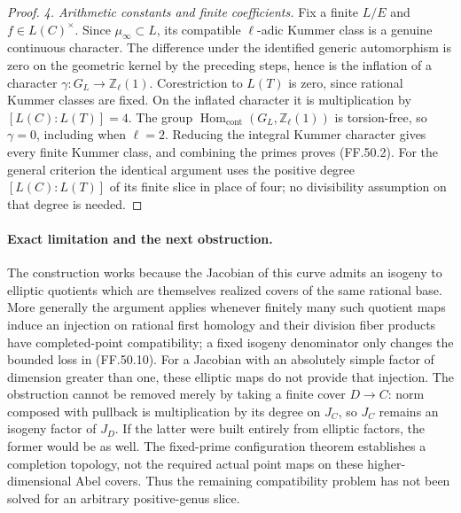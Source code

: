 \begin{proof}
\emph{4. Arithmetic constants and finite coefficients.}
Fix a finite \(L/E\) and \(f\in L(C)^\times\).
Since \(\mu_\infty\subset L\), its compatible
\(\ell\)-adic Kummer class is a genuine continuous
character. The difference under the identified
generic automorphism is zero on the geometric
kernel by the preceding steps, hence is the
inflation of a character
\(\gamma:G_L\to\mathbb Z_\ell(1)\).
Corestriction to \(L(T)\) is zero, since rational
Kummer classes are fixed. On the inflated character
it is multiplication by \([L(C):L(T)]=4\).
The group \(\operatorname{Hom}_{\mathrm{cont}}
(G_L,\mathbb Z_\ell(1))\) is torsion-free, so
\(\gamma=0\), including when \(\ell=2\).
Reducing the integral Kummer character gives every
finite Kummer class, and combining the primes
proves (FF.50.2).
For the general criterion the identical argument uses
the positive degree \([L(C):L(T)]\) of its finite
slice in place of four; no divisibility assumption
on that degree is needed.
\end{proof}

\paragraph{Exact limitation and the next obstruction.}
The construction works because the Jacobian of this
curve admits an isogeny to elliptic quotients which
are themselves realized covers of the same rational
base. More generally the argument applies whenever
finitely many such quotient maps induce an injection
on rational first homology and their division
fiber products have completed-point compatibility;
a fixed isogeny denominator only changes the bounded
loss in (FF.50.10). For a Jacobian with an absolutely
simple factor of dimension greater than one, these
elliptic maps do not provide that injection. The
obstruction cannot be removed merely by taking a
finite cover \(D\to C\): norm composed with
pullback is multiplication by its degree on
\(J_C\), so \(J_C\) remains an isogeny factor
of \(J_D\). If the latter were built entirely
from elliptic factors, the former would be as well.
The
fixed-prime configuration theorem establishes a
completion topology, not the required actual point
maps on these higher-dimensional Abel covers.
Thus the remaining compatibility problem has not
been solved for an arbitrary positive-genus slice.
